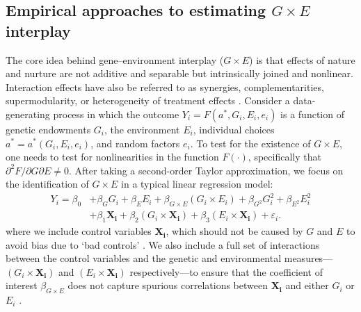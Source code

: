 \documentclass[12pt,a4paper]{article}
\begin{document}
\begin{bibunit}
\section{Empirical approaches to estimating \texorpdfstring{$G \times E$}{} interplay}
\label{sec:specification}
The core idea behind gene--environment interplay ($G \times E$) is that effects of nature and nurture are not additive and separable but intrinsically joined and nonlinear. 
Interaction effects have also be referred to as synergies, complementarities, supermodularity, or heterogeneity of treatment effects \citep{Mullahy1999}. 
Consider a data-generating process in which the outcome $Y_{i}=F(a^{*},G_{i},E_{i},e_{i})$ is a function of genetic endowments $G_{i}$, the environment $E_{i}$, individual choices $a^{*}=a^{*}(G_{i},E_{i},e_{i})$, and random factors $e_{i}$. To test for the existence of $G \times E$, one needs to test for nonlinearities in the function $F(\cdot)$, specifically that $\partial^2 F/\partial G \partial E \neq 0$. 
After taking a second-order Taylor approximation, we focus on the identification of $G \times E$ in a typical linear regression model:
\begin{align}
Y_{i}=\beta_0 & +\beta_{G} G_{i} + \beta_{E} E_{i} + \beta_{G \times E} \left(G_{i} \times E_{i}\right) + \beta_{G^2}G_{i}^{2} + \beta_{E^2}E_{i}^{2} \nonumber \\
             & +\beta_{1} \mathbf{X_{i}} + \beta_{2} \left(G_{i} \times \mathbf{X_{i}}\right) + \beta_{3} \left(E_{i} \times \mathbf{X_{i}}\right) +\varepsilon_{i}.
 \label{eq:function}
 \end{align}
where we include control variables $\mathbf{X_{i}}$, which should not be caused by $G$ and $E$ to avoid bias due to `bad controls' \citep[e.g.,][]{angrist2008mostly}. 
We also include a full set of interactions between the control variables and the genetic and environmental measures---$\left(G_{i} \times \mathbf{X_{i}}\right)$ and $\left(E_{i} \times \mathbf{X_{i}}\right)$ respectively---to ensure that the coefficient of interest $\beta_{G \times E}$ does not capture spurious correlations between $\mathbf{X_{i}}$ and either $G_i$ or $E_i$ \citep{Keller2014,feigenberg2023omitted}.


\end{bibunit}
\end{document}
